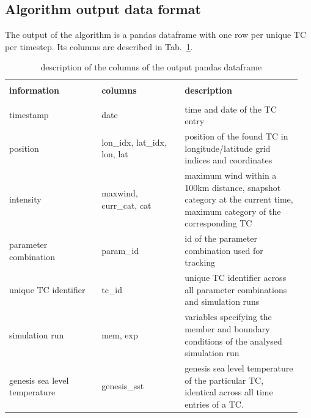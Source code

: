 \subsection{Algorithm output data format}
The output of the algorithm is a pandas dataframe with one row per unique TC per timestep. Its columns are described in Tab.~\ref{tab:output-data}.
\begingroup
\begin{table}[]
	\centering
	\begin{tabular}{| p{0.3\linewidth} | p{0.27\linewidth} | p{0.38\linewidth }|}
		\hline
		                              &                              &                                                                                        \\[-0.5em]
		\textbf{information}          & \textbf{columns}             & \textbf{description}                                                                   \\[5pt] \hline
		                              &                              &                                                                                        \\[-0.5em]
		timestamp                     & date                         & time and date of the TC entry                                                          \\[5pt]
		position                      & lon\_idx, lat\_idx, lon, lat & position of the found TC in longitude/latitude grid indices and coordinates            \\[5pt]
		intensity                     &
		maxwind, curr\_cat, cat       &
		maximum wind within a 100km distance, snapshot category at the current time, maximum category of the corresponding TC                                 \\[5pt]
		parameter combination         & param\_id                    & id of the parameter combination used for tracking                                      \\[5pt]
		unique TC identifier          & tc\_id                       & unique TC identifier across all parameter combinations and simulation runs             \\[5pt]
		simulation run                & mem, exp                     & variables specifying the member and boundary conditions of the analysed simulation run \\[5pt]
		genesis sea level temperature &
		genesis\_sst                  &
		genesis sea level temperature of the particular TC, identical across all time entries of a TC.                                                        \\[5pt] \hline
	\end{tabular}
	\caption{description of the columns of the output pandas dataframe \cite{pandas}}
	\label{tab:output-data}
\end{table}
\endgroup

